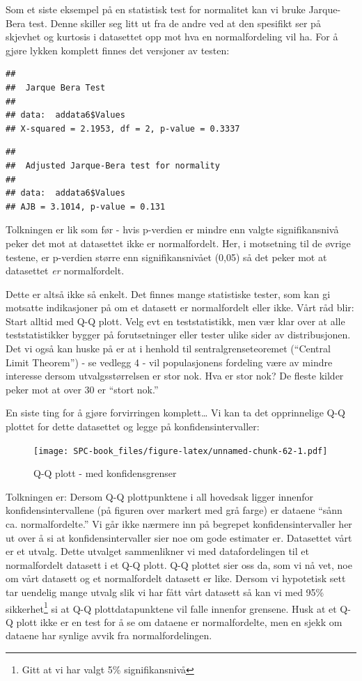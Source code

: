 \documentclass[
]{book}
\begin{document}
Som et siste eksempel på en statistisk test for normalitet kan vi bruke Jarque-Bera test. Denne skiller seg litt ut fra de andre ved at den spesifikt ser på skjevhet og kurtosis i datasettet opp mot hva en normalfordeling vil ha. For å gjøre lykken komplett finnes det versjoner av testen:

\begin{verbatim}
## 
##  Jarque Bera Test
## 
## data:  addata6$Values
## X-squared = 2.1953, df = 2, p-value = 0.3337
\end{verbatim}

\begin{verbatim}
## 
##  Adjusted Jarque-Bera test for normality
## 
## data:  addata6$Values
## AJB = 3.1014, p-value = 0.131
\end{verbatim}

Tolkningen er lik som før - hvis p-verdien er mindre enn valgte signifikansnivå peker det mot at datasettet ikke er normalfordelt. Her, i motsetning til de øvrige testene, er p-verdien større enn signifikansnivået (0,05) så det peker mot at datasettet \emph{er} normalfordelt.

Dette er altså ikke så enkelt. Det finnes mange statistiske tester, som kan gi motsatte indikasjoner på om et datasett er normalfordelt eller ikke. Vårt råd blir: Start alltid med Q-Q plott. Velg evt en teststatistikk, men vær klar over at alle teststatistikker bygger på forutsetninger eller tester ulike sider av distribusjonen. Det vi også kan huske på er at i henhold til sentralgrenseteoremet (``Central Limit Theorem'') - se vedlegg 4 - vil populasjonens fordeling være av mindre interesse dersom utvalgsstørrelsen er stor nok. Hva er stor nok? De fleste kilder peker mot at over 30 er ``stort nok.''

En siste ting for å gjøre forvirringen komplett\ldots{} Vi kan ta det opprinnelige Q-Q plottet for dette datasettet og legge på konfidensintervaller:

\begin{figure}
\centering
\texttt{[image: SPC-book\_files/figure-latex/unnamed-chunk-62-1.pdf]}
\caption{\label{fig:unnamed-chunk-62}Q-Q plott - med konfidensgrenser}
\end{figure}

Tolkningen er: Dersom Q-Q plottpunktene i all hovedsak ligger innenfor konfidensintervallene (på figuren over markert med grå farge) er dataene ``sånn ca. normalfordelte.'' Vi går ikke nærmere inn på begrepet konfidensintervaller her ut over å si at konfidensintervaller sier noe om gode estimater er. Datasettet vårt er et utvalg. Dette utvalget sammenlikner vi med datafordelingen til et normalfordelt datasett i et Q-Q plott. Q-Q plottet sier oss da, som vi nå vet, noe om vårt datasett og et normalfordelt datasett er like. Dersom vi hypotetisk sett tar uendelig mange utvalg slik vi har fått vårt datasett så kan vi med 95\% sikkerhet\footnote{Gitt at vi har valgt 5\% signifikansnivå} si at Q-Q plottdatapunktene vil falle innenfor grensene. Husk at et Q-Q plott ikke er en test for å se om dataene er normalfordelte, men en sjekk om dataene har synlige avvik fra normalfordelingen.
\end{document}
